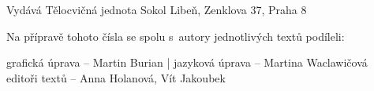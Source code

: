 \documentclass[11pt]{article}
\begin{document}
\signature{Vzdělavatelka Anka Holanová a Bára Jeníková}

\clearpage

\pagestyle{blank}

\vspace*{96pt}

\pagecolor{sokolred}
\color{white}


\vspace*{\fill}

\begin{center}
Vydává Tělocvičná jednota Sokol Libeň, Zenklova 37, Praha 8

\vspace*{12pt}

Na přípravě tohoto čísla se spolu s~autory jednotlivých textů podíleli:

grafická úprava – Martin Burian | jazyková úprava – Martina Waclawičová \\ editoři textů – Anna Holanová, Vít Jakoubek
\end{center}
\end{document}
